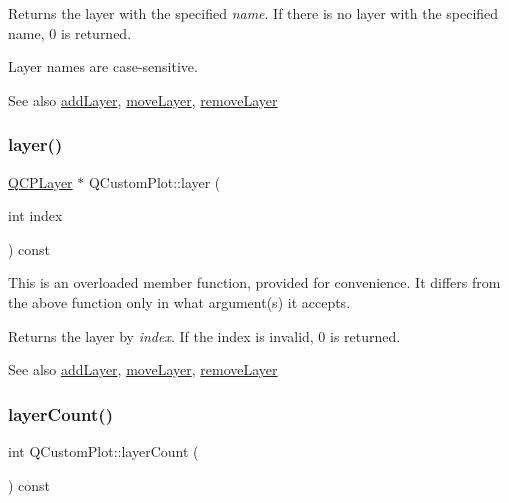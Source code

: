 Returns the layer with the specified {\itshape name}. If there is no layer with the specified name, 0 is returned.

Layer names are case-\/sensitive.

\begin{DoxySeeAlso}{See also}
\hyperlink{class_q_custom_plot_ad5255393df078448bb6ac83fa5db5f52}{add\+Layer}, \hyperlink{class_q_custom_plot_ae896140beff19424e9e9e02d6e331104}{move\+Layer}, \hyperlink{class_q_custom_plot_a40f75e342c5eaab6a86066a42a0e2a94}{remove\+Layer} 
\end{DoxySeeAlso}
\mbox{\label{class_q_custom_plot_acbb570f4c24306e7c2324d40bfe157c2}} 
\subsubsection{\texorpdfstring{layer()}{layer()}\hspace{0.1cm}{\footnotesize\ttfamily [2/2]}}
{\footnotesize\ttfamily \hyperlink{class_q_c_p_layer}{Q\+C\+P\+Layer} $\ast$ Q\+Custom\+Plot\+::layer (\begin{DoxyParamCaption}\item[{int}]{index }\end{DoxyParamCaption}) const}

This is an overloaded member function, provided for convenience. It differs from the above function only in what argument(s) it accepts.

Returns the layer by {\itshape index}. If the index is invalid, 0 is returned.

\begin{DoxySeeAlso}{See also}
\hyperlink{class_q_custom_plot_ad5255393df078448bb6ac83fa5db5f52}{add\+Layer}, \hyperlink{class_q_custom_plot_ae896140beff19424e9e9e02d6e331104}{move\+Layer}, \hyperlink{class_q_custom_plot_a40f75e342c5eaab6a86066a42a0e2a94}{remove\+Layer} 
\end{DoxySeeAlso}
\mbox{\label{class_q_custom_plot_afa45d61e65292026f4c58c9c88c2cef0}} 
\subsubsection{\texorpdfstring{layer\+Count()}{layerCount()}}
{\footnotesize\ttfamily int Q\+Custom\+Plot\+::layer\+Count (\begin{DoxyParamCaption}{ }\end{DoxyParamCaption}) const}

